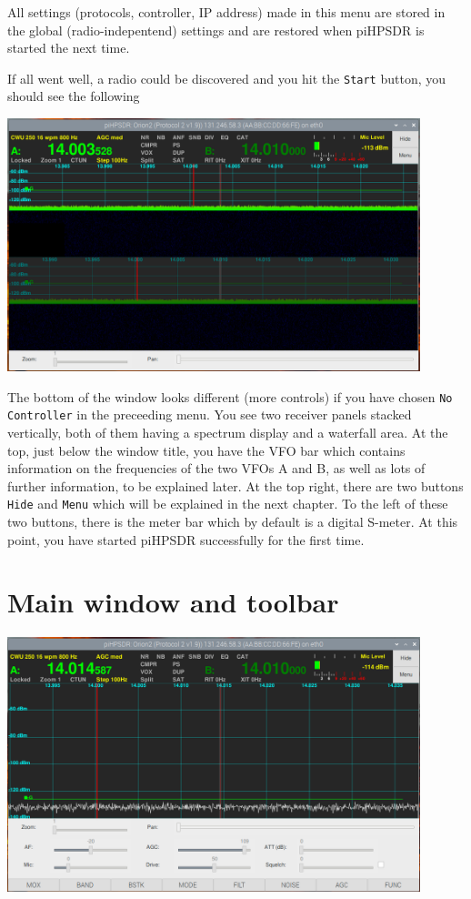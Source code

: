 \documentclass[12pt]{book}
\begin{document}
All settings (protocols, controller, IP address) made in this menu are stored in the global (radio-indepentend) settings
and are restored when piHPSDR is started the next time. 

If all went well, a radio could be discovered and you hit the \texttt{Start} button, you should see the following

\begin{center}
\includegraphics[width=12cm]{FirstDisplay.png}
\end{center}

The bottom of the window looks different (more controls) if you have chosen \texttt{No Controller} in the preceeding menu.
You see two receiver panels stacked vertically, both of them having a spectrum display and a waterfall area. At the top,
just below the window title, you have the VFO bar which contains information on the frequencies of the two VFOs A and B,
as well as lots of further information, to be explained later. At the top right, there are two buttons \texttt{Hide}
and \texttt{Menu} which will be explained in the next chapter. To the left of these two buttons, there is the meter
bar which by default is a digital S-meter. At this point, you have started piHPSDR successfully for the first time.

\chapter{Main window and toolbar}

\begin{center}
\includegraphics[width=12cm]{SingleReceiver.png}
\end{center}
\end{document}
